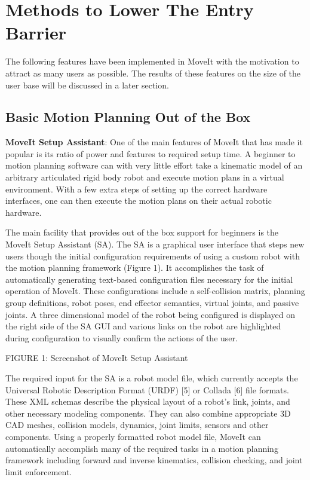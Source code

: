 \documentclass[10pt,journal,compsoc]{joser1}
\begin{document}
{\section{Methods to Lower The Entry Barrier}
\label{sec::lowering_barriers}

The following features have been implemented in MoveIt with the motivation to attract as many users as possible. The results of these features on the size of the user base will be discussed in a later section.

\subsection{Basic Motion Planning Out of the Box}

{\bf MoveIt Setup Assistant}: One of the main features of MoveIt that has made it popular is its ratio of power and features to required setup time. A beginner to motion planning software can with very little effort take a kinematic model of an arbitrary articulated rigid body robot and execute motion plans in a virtual environment. With a few extra steps of setting up the correct hardware interfaces, one can then execute the motion plans on their actual robotic hardware.

The main facility that provides out of the box support for beginners is the MoveIt Setup Assistant (SA). The SA is a graphical user interface that steps new users though the initial configuration requirements of using a custom robot with the motion planning framework (Figure 1). It accomplishes the task of automatically generating text-based configuration files necessary for the initial operation of MoveIt. These configurations include a self-collision matrix, planning group definitions, robot poses, end effector semantics, virtual joints, and passive joints. A three dimensional model of the robot being configured is displayed on the right side of the SA GUI and various links on the robot are highlighted during configuration to visually confirm the actions of the user.

FIGURE 1: Screenshot of MoveIt Setup Assistant

The required input for the SA is a robot model file, which currently accepts the Universal Robotic Description Format (URDF) [5] or Collada [6] file formats. These XML schemas describe the physical layout of a robot's link, joints, and other necessary modeling components. They can also combine appropriate 3D CAD meshes, collision models, dynamics, joint limits, sensors and other components. Using a properly formatted robot model file, MoveIt can automatically accomplish many of the required tasks in a motion planning framework including forward and inverse kinematics, collision checking, and joint limit enforcement.

}
\end{document}
